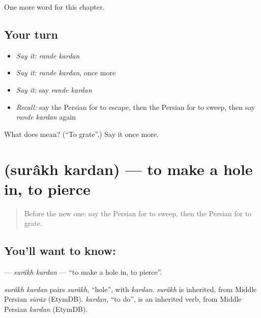 \begin{grammarlens}[title={What you've built}]
One more word for this chapter.
\end{grammarlens}

\subsection*{Your turn}
\begin{itemize}
\raggedright
  \item \emph{Say it:} \emph{rande kardan}
  \item \emph{Say it:} \emph{rande kardan}, once more
  \item \emph{Say it:} say \emph{rande kardan}
  \item \emph{Recall:} say the Persian for to escape, then the Persian for to sweep, then say \emph{rande kardan} again
\end{itemize}

\begin{tcolorbox}[breakable,colback=teal!4,colframe=teal!35!black,title={Before you move on}]
What does   mean? (\textquotedblleft{}To grate\textquotedblright{}.) Say it once more.
\end{tcolorbox}
\section[\texorpdfstring{\fa{سوراخ} \fa{کردن} (surâkh kardan)}{سوراخ کردن (surâkh kardan)}]{  (surâkh kardan) — to make a hole in, to pierce}

\label{lesson:FA-C260-surakh-kardan}



\begin{quote}
Before the new one: say the Persian for to sweep, then the Persian for to grate.
\end{quote}

\subsection*{You'll want to know:  }
\textbf{ } — \emph{surâkh kardan} — \textquotedblleft{}to make a hole in, to pierce\textquotedblright{}.

\begin{cousinweb}
\emph{surâkh kardan} pairs \emph{surâkh}, \textquotedblleft{}hole\textquotedblright{}, with \emph{kardan}. \emph{surâkh} is inherited, from Middle Persian \emph{sūrāx} (EtymDB). \emph{kardan}, \textquotedblleft{}to do\textquotedblright{}, is an inherited verb, from Middle Persian \emph{kardan} (EtymDB).
\end{cousinweb}

